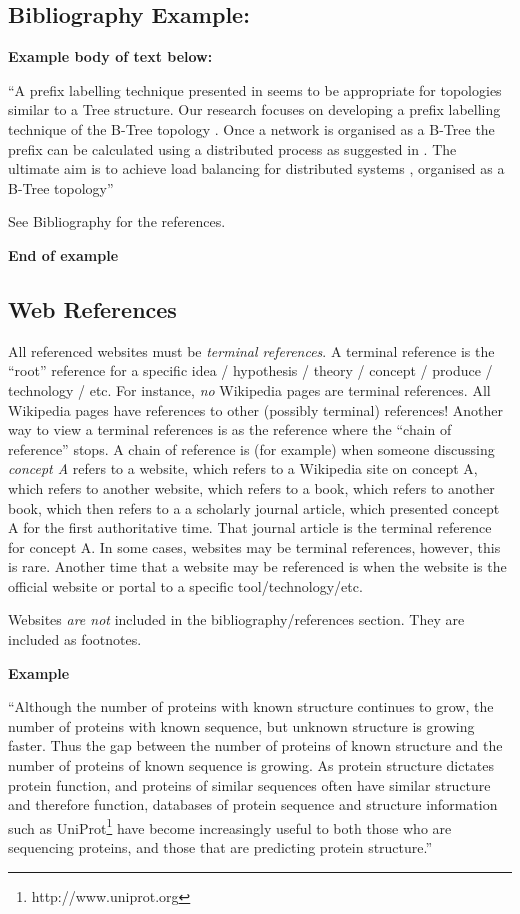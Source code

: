 \documentclass{report}[a4paper,12pt,onecolumn]
\begin{document}
\subsection{Bibliography Example:}

\textbf{Example body of text below:}

``A prefix labelling technique presented in \cite{prefixlabel} seems to be appropriate for topologies similar to a Tree structure. Our research focuses on developing a prefix labelling technique of the B-Tree topology \cite{btree}. Once a network is organised as a B-Tree the prefix can be calculated using a distributed process as suggested in \cite{prefixlabel}. The ultimate aim is to achieve load balancing for distributed systems \cite{loaddistrib}, \cite{loadparallel} organised as a B-Tree topology''

See Bibliography for the references.

\textbf{End of example}

\subsection{Web References}

All referenced websites must be \textit{terminal references}. A terminal 
reference is the ``root'' reference for a specific idea 
/ hypothesis / theory / concept / produce / technology / etc. For instance, 
\textit{no} Wikipedia pages are terminal references. All Wikipedia pages have 
references to other (possibly terminal) references! Another way to view a 
terminal references is as the reference where the ``chain of reference'' stops. 
A chain of reference is (for example) when someone discussing \textit{concept A} 
refers to a website, which refers to a Wikipedia site on concept A, which refers 
to another website, which refers to a book, which refers to another book, which 
then refers to a a scholarly journal article, which presented concept A for the 
first authoritative time. That journal article is the terminal reference for 
concept A. In some cases, websites may be terminal references, however, this is 
rare. Another time that a website may be referenced is when the website is the 
official website or portal to a specific tool/technology/etc.

Websites \textit{are not} included in the bibliography/references section. They are included as footnotes.

\textbf{Example}

``Although the number of proteins with known structure continues to grow, the number of proteins with known sequence, but unknown structure is growing faster. Thus the gap between the number of proteins of known structure and the number of proteins of known sequence is growing. As protein structure dictates protein function, and proteins of similar sequences often have similar structure and therefore function, databases of protein sequence and structure information such as UniProt\footnote{\label{uniprot}http://www.uniprot.org} have become increasingly useful to both those who are sequencing proteins, and those that are predicting protein structure.''
\end{document}
